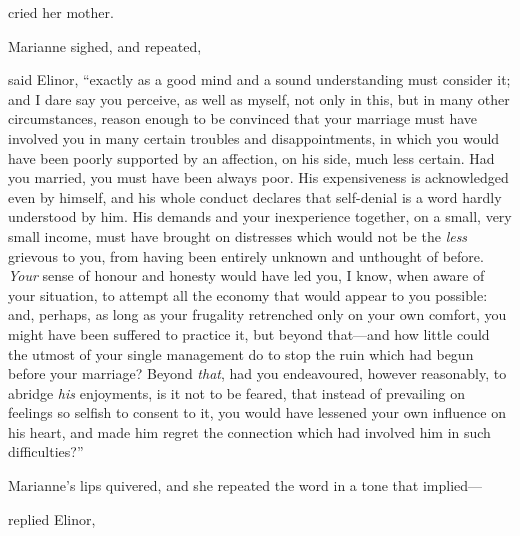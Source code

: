  cried her mother. 

Marianne sighed, and repeated, 

 said Elinor, “exactly as a good mind and a sound understanding must consider it; and I dare say you perceive, as well as myself, not only in this, but in many other circumstances, reason enough to be convinced that your marriage must have involved you in many certain troubles and disappointments, in which you would have been poorly supported by an affection, on his side, much less certain. Had you married, you must have been always poor. His expensiveness is acknowledged even by himself, and his whole conduct declares that self-denial is a word hardly understood by him. His demands and your inexperience together, on a small, very small income, must have brought on distresses which would not be the {\em less} grievous to you, from having been entirely unknown and unthought of before. {\em Your} sense of honour and honesty would have led you, I know, when aware of your situation, to attempt all the economy that would appear to you possible: and, perhaps, as long as your frugality retrenched only on your own comfort, you might have been suffered to practice it, but beyond that---and how little could the utmost of your single management do to stop the ruin which had begun before your marriage? Beyond {\em that}, had you endeavoured, however reasonably, to abridge {\em his} enjoyments, is it not to be feared, that instead of prevailing on feelings so selfish to consent to it, you would have lessened your own influence on his heart, and made him regret the connection which had involved him in such difficulties?”

Marianne's lips quivered, and she repeated the word  in a tone that implied---

 replied Elinor, 


